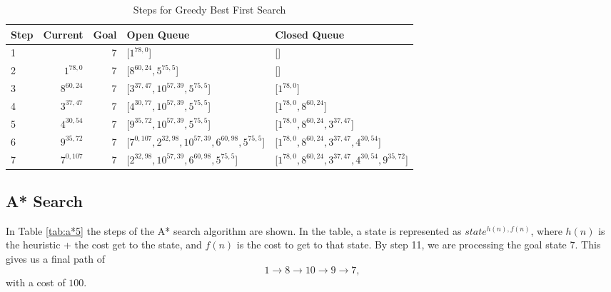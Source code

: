 \documentclass{article}
\begin{document}
    \begin{table}[!htp]\centering
        \caption{Steps for Greedy Best First Search}\label{tab:gbfs5}
        \scriptsize
        \begin{tabular}{lrrll}\toprule
        Step &Current &Goal & Open Queue &Closed Queue  \\\midrule
        1&  &7 &[$1^{78,0}$] &[] \\
        2& $1^{78,0}$ &7 &[$8^{60,24}, 5^{75,5}$] &[] \\
        3& $8^{60,24}$ &7 &[$3^{37,47}, 10^{57, 39}, 5^{75,5}$] &[$1^{78,0}$] \\
        4& $3^{37,47}$ &7 &[$4^{30, 77}, 10^{57, 39}, 5^{75,5}$] &[$1^{78,0}, 8^{60,24}$] \\
        5& $4^{30,54}$ &7 &[$9^{35, 72}, 10^{57,39}, 5^{75,5}$] &[$1^{78,0}, 8^{60,24}, 3^{37,47}$] \\
        6& $9^{35,72}$ &7 &[$7^{0, 107}, 2^{32, 98}, 10^{57,39}, 6^{60, 98}, 5^{75,5}$] &[$1^{78,0}, 8^{60,24}, 3^{37,47}, 4^{30,54}$] \\
        7& $7^{0,107}$ &7 &[$2^{32, 98}, 10^{57,39}, 6^{60, 98}, 5^{75,5}$] &[$1^{78,0}, 8^{60,24}, 3^{37,47}, 4^{30,54}, 9^{35,72}$] \\
        \end{tabular}
    \end{table}


\subsection{A* Search}

    In Table \ref{tab:a*5} the steps of the A* search algorithm are shown. In the table, a state is represented as $state^{h(n), f(n)}$, where $h(n)$ is the heuristic + the cost get to the state, and $f(n)$ is the cost to get to that state.
    By step 11, we are processing the goal state $7$. This gives us a final path of
    \begin{equation}
        1 \rightarrow 8 \rightarrow 10 \rightarrow 9 \rightarrow 7,
    \end{equation}
    with a cost of $100$.
\end{document}

